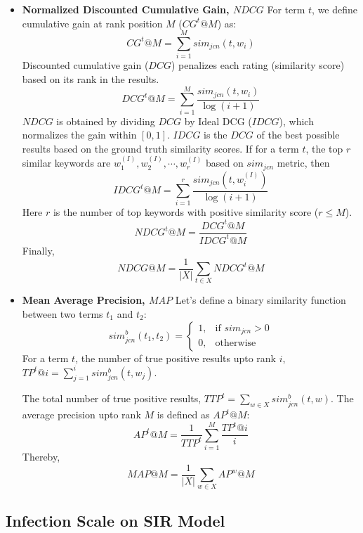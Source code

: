 \documentclass[sigconf]{acmart}
\begin{document}
\begin{itemize}
	\item{\textbf{Normalized Discounted Cumulative Gain, $NDCG$}}
	For term $t$, we define cumulative gain at rank position $M$ ($CG^t@M$) as:
	\begin{equation}
	CG^t@M = \sum_{i=1}^{M} sim_{jcn}(t, w_i)
	\end{equation}
	Discounted cumulative gain ($DCG$) penalizes each rating (similarity score) based on its rank in the results. 
	\begin{equation}
	DCG^t@M = \sum_{i=1}^{M} \frac{sim_{jcn}(t, w_i)}{\log{ (i+1)}}
	\end{equation}
	$NDCG$ is obtained by dividing $DCG$ by Ideal DCG ($IDCG$), which normalizes the gain within $[0,1]$. $IDCG$ is the $DCG$ of the best possible results based on the ground truth similarity scores. If for a term $t$, the top $r$ similar keywords are $w^{(I)}_1, w^{(I)}_2, \cdots, w^{(I)}_r$ based on $sim_{jcn}$ metric, then
	\begin{equation}
	IDCG^t@M = \sum_{i=1}^{r} \frac{sim_{jcn}(t, w^{(I)}_i)}{\log{ (i+1)}}
	\end{equation}
	Here $r$ is the number of top keywords with positive similarity score ($ r \le M$). 
	\begin{equation}
	 NDCG^t@M = \frac{DCG^t@M}{IDCG^t@M}
	\end{equation}
	Finally,
	\begin{equation}
	NDCG@M = \frac{1}{|X|} \sum_{t \in X} NDCG^t@M
	\end{equation}
	
	\item{\textbf{Mean Average Precision, $MAP$}}
	Let's define a binary similarity function between two terms $t_1$ and $t_2$:
	\begin{equation}
	sim^b_{jcn}(t_1, t_2)= 
	\begin{cases}
	1,& \text{if } sim_{jcn}> 0\\
	0,              & \text{otherwise}
	\end{cases}
	\end{equation}
	For a term $t$, the number of true positive results upto rank $i$, $TP^t@i = \sum_{j=1}^{i} sim^b_{jcn} (t, w_j)$. 
	
	The total number of true positive results, 
	$TTP^t = \sum_{w \in X} sim^b_{jcn} (t, w)$. The average precision upto rank $M$ is defined as $AP^t@M$:
	\begin{equation}
	AP^t@M = \frac{1}{TTP^t} \sum_{i=1}^M \frac{TP^t@i}{i}
	\end{equation}
	Thereby,
	\begin{equation}
	MAP@M = \frac{1}{|X|} \sum_{w \in X} AP^w@M
	\end{equation}
	
\end{itemize}


\subsection{Infection Scale on SIR Model}





\end{document}
